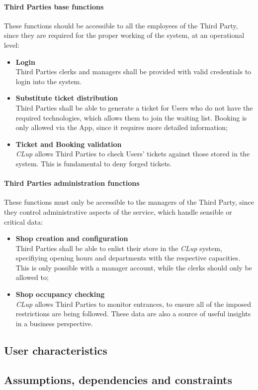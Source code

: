 \paragraph{Third Parties base functions}
    These functions should be accessible to all the employees of the Third Party, since they are required for the proper working of the system, at an operational level:
\begin{itemize}
    \item\textbf{Login}\\
    Third Parties clerks and managers shall be provided with valid credentials to login into the system.
    \item\textbf{Substitute ticket distribution}\\
    Third Parties shall be able to generate a ticket for Users who do not have the required technologies, which allows them to join the waiting list. Booking is only allowed via the App, since it requires more detailed information;
    \item\textbf{Ticket and Booking validation}\\
    \emph{CLup} allows Third Parties to check Users' tickets against those stored in the system. This is fundamental to deny forged tickets.
\end{itemize}    
\paragraph{Third Parties administration functions}
These functions must only be accessible to the managers of the Third Party, since they control administrative aspects of the service, which handle sensible or critical data:
\begin{itemize}
    \item\textbf{Shop creation and configuration}\\
    Third Parties shall be able to enlist their store in the \emph{CLup} system, specifiying opening hours and departments with the respective capacities. This is only possible with a manager account, while the clerks should only be allowed to;
    \item\textbf{Shop occupancy checking}\\
    \emph{CLup} allows Third Parties to monitor entrances, to ensure all of the imposed restrictions are being followed. These data are also a source of useful insights in a business perspective.
\end{itemize}
\subsection{User characteristics}
\subsection{Assumptions, dependencies and constraints}

